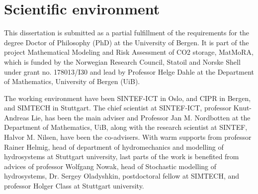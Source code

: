 \chapter{Scientific environment}

This dissertation is submitted as a partial fulfillment of the requirements for
the degree Doctor of Philosophy (PhD) at the University of Bergen. It is part
of the project Mathematical Modeling and Risk Assessment of CO2 storage,
MatMoRA, which is funded by the Norwegian Research Council, Statoil and Norske
Shell under grant no. 178013/I30 and lead by Professor Helge Dahle at the
Department of Mathematics, University of Bergen (UiB). 

The working environment have been SINTEF-ICT in Oslo, and CIPR in Bergen, and
SIMTECH in Stuttgart. The chief scientist at SINTEF-ICT, professor Knut-Andreas
Lie, has been the main adviser and Professor
Jan M. Nordbotten at the Department of Mathematics, UiB, along with the research
scientist at SINTEF, Halvor M. Nilsen, have been the co-advisers. With warm
supports from professor Rainer Helmig, head of department of hydromechanics and
modelling of hydrosystems at Stuttgart university, last parts of the work is
benefited from advices of professor Wolfgang Nowak, head of Stochastic modelling
of hydrosystems, Dr. Sergey Oladyshkin, postdoctoral fellow at SIMTECH,
and professor Holger Class at Stuttgart university. 